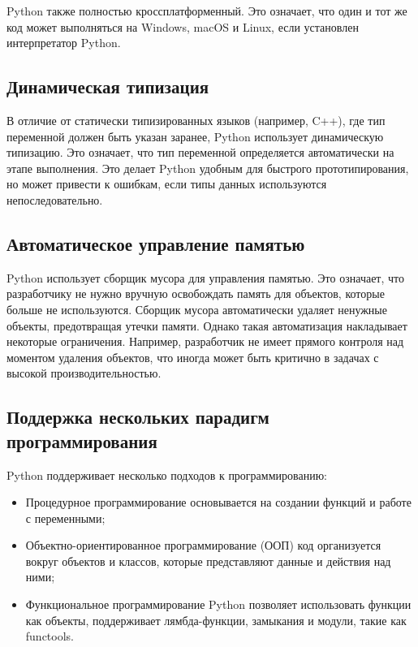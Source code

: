 Python также полностью кроссплатформенный. Это означает, что один и тот же код может выполняться на Windows, macOS и Linux, если установлен интерпретатор Python.

\subsection*{Динамическая типизация}

В отличие от статически типизированных языков (например, C++), где тип переменной должен быть указан заранее, Python использует динамическую типизацию. Это означает, что тип переменной определяется автоматически на этапе выполнения. Это делает Python удобным для быстрого прототипирования, но может привести к ошибкам, если типы данных используются непоследовательно.

\subsection*{Автоматическое управление памятью}

Python использует сборщик мусора для управления памятью. Это означает, что разработчику не нужно вручную освобождать память для объектов, которые больше не используются. Сборщик мусора автоматически удаляет ненужные объекты, предотвращая утечки памяти. Однако такая автоматизация накладывает некоторые ограничения. Например, разработчик не имеет прямого контроля над моментом удаления объектов, что иногда может быть критично в задачах с высокой производительностью.

\subsection*{Поддержка нескольких парадигм программирования}

Python поддерживает несколько подходов к программированию:
\begin{itemize}
    \item Процедурное программирование основывается на создании функций и работе с переменными;
    \item Объектно-ориентированное программирование (ООП) код организуется вокруг объектов и классов, которые представляют данные и действия над ними;
    \item Функциональное программирование Python позволяет использовать функции как объекты, поддерживает лямбда-функции, замыкания и модули, такие как functools.
\end{itemize}

